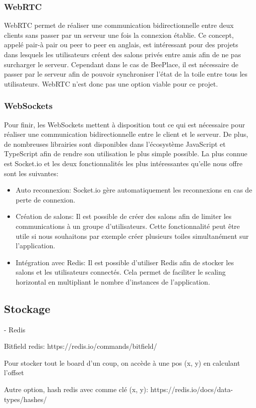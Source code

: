 \subsubsection{WebRTC}
WebRTC permet de réaliser une communication bidirectionnelle entre deux clients sans passer par un serveur une fois la connexion établie. Ce concept, appelé pair-à pair ou peer to peer en anglais, est intéressant pour des projets dans lesquels les utilisateurs créent des salons privés entre amis afin de ne pas surcharger le serveur. Cependant dans le cas de BeePlace, il est nécessaire de passer par le serveur afin de pouvoir synchroniser l'état de la toile entre tous les utilisateurs. WebRTC n'est donc pas une option viable pour ce projet.

\subsubsection{WebSockets}
Pour finir, les WebSockets mettent à disposition tout ce qui est nécessaire pour réaliser une communication bidirectionnelle entre le client et le serveur. De plus, de nombreuses librairies sont disponibles dans l'écosystème JavaScript et TypeScript afin de rendre son utilisation le plus simple possible. La plus connue est Socket.io et les deux fonctionnalités les plus intéressantes qu'elle nous offre sont les suivantes:

\begin{itemize}
  \item Auto reconnexion: Socket.io gère automatiquement les reconnexions en cas de perte de connexion.
  \item Création de salons: Il est possible de créer des salons afin de limiter les communications à un groupe d'utilisateurs. Cette fonctionnalité peut être utile si nous souhaitons par exemple créer plusieurs toiles simultanément sur l'application.
  \item Intégration avec Redis: Il est possible d'utiliser Redis afin de stocker les salons et les utilisateurs connectés. Cela permet de faciliter le scaling horizontal en multipliant le nombre d'instances de l'application.
\end{itemize}

\subsection{Stockage}

- Redis

Bitfield redis: https://redis.io/commands/bitfield/

Pour stocker tout le board d'un coup, on accède à une pos (x, y) en calculant l'offset

Autre option, hash redis avec comme clé (x, y): https://redis.io/docs/data-types/hashes/
